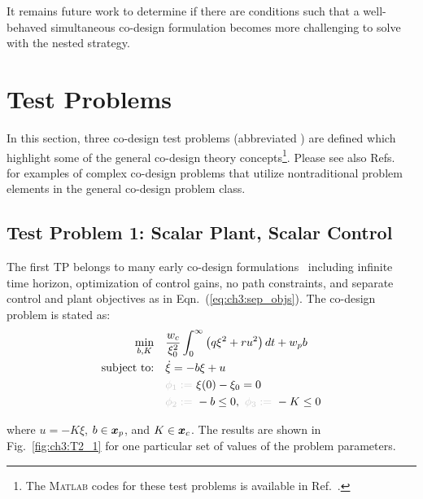It remains future work to determine if there are conditions such that a well-behaved simultaneous co-design formulation becomes more challenging to solve with the nested strategy.

\section{Test Problems \label{sec:ch3:casestudies}}

In this section, three co-design test problems (abbreviated ) are defined which highlight some of the general co-design theory concepts\footnote{The \textsc{Matlab} codes for these test problems is available in Ref.~\cite{github-co-design-examples-repository}.}.
Please see also Refs.~\cite{Allison2013d, Allison2014b, Deshmukh2016a, Fathy2003a, Herber2013a, Maraniello2016a, Yan2009a, Chilan2017a} for examples of complex co-design problems that utilize nontraditional problem elements in the general co-design problem class.

\subsection{Test Problem 1: Scalar Plant, Scalar Control }

The first TP belongs to many early co-design formulations~\cite{Sunar1993a, Fathy2001a} including infinite time horizon, optimization of control gains, no path constraints, and separate control and plant objectives as in Eqn.~(\ref{eq:ch3:sep_objs}). The co-design problem is stated as:
\begin{subequations}
\begin{align}
\min_{b, K} \quad & \frac{w_c}{\xi_0^2} \int_{0}^{\infty} \left( q \xi^2 + r u^2  \right) dt + w_p b \\
\text{subject to:} \quad & \dot{\xi} = -b\xi + u \\
& \textcolor{light-gray}{\phi_1 := }\  \xi(0) - \xi_0 = 0 \\
& \textcolor{light-gray}{\phi_2 := }\  -b \leq 0, \ \textcolor{light-gray}{\phi_3 := }\ -K \leq 0
\end{align}
\end{subequations}

\noindent where $u = - K \xi$, $b \in \bm{x}_p$, and $K \in \bm{x}_c$. The results are shown in Fig.~\ref{fig:ch3:T2_1} for one particular set of values of the problem parameters. 



